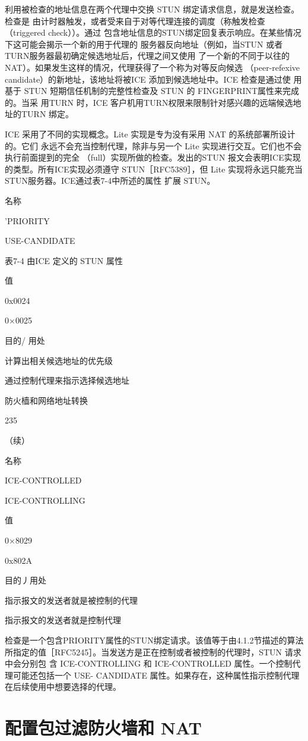 利用被检查的地址信息在两个代理中交换 STUN 绑定请求信息，就是发送检查。检查是
由计时器触发，或者受来自于对等代理连接的调度（称触发检查（triggered check））。通过
包含地址信息的STUN绑定回复表示响应。在某些情况下这可能会揭示一个新的用于代理的
服务器反向地址（例如，当STUN 或者 TURN服务器最初确定候选地址后，代理之间又使用
了一个新的不同于以往的NAT）。如果发生这样的情况，代理获得了一个称为对等反向候选
（peer-refexive candidate）的新地址，该地址将被ICE 添加到候选地址中。ICE 检查是通过使
用基于 STUN 短期信任机制的完整性检查及 STUN 的 FINGERPRINT属性来完成的。当采
用TURN 时，ICE 客户机用TURN权限来限制针对感兴趣的远端候选地址的TURN 绑定。

ICE 采用了不同的实现概念。Lite 实现是专为没有采用 NAT 的系统部署所设计的。它们
永远不会充当控制代理，除非与另一个 Lite 实现进行交互。它们也不会执行前面提到的完全
（full）实现所做的检查。发出的STUN 报文会表明ICE实现的类型。所有ICE实现必须遵守
STUN［RFC5389］，但 Lite 实现将永远只能充当STUN服务器。ICE通过表7-4中所述的属性
扩展 STUN。

名称

'PRIORITY

USE-CANDIDATE

表7-4 由ICE 定义的 STUN 属性

值

0x0024

0×0025

目的/ 用处

计算出相关候选地址的优先级

通过控制代理来指示选择候选地址

防火樯和网络地址转换

235

（续）

名称

ICE-CONTROLLED

ICE-CONTROLLING

值

0×8029

0x802A

目的丿用处

指示报文的发送者就是被控制的代理

指示报文的发送者就是控制代理

检查是一个包含PRIORITY属性的STUN绑定请求。该值等于由4.1.2节描述的算法
所指定的值［RFC5245］。当发送方是正在控制或者被控制的代理时，STUN 请求中会分别包
含 ICE-CONTROLLING 和 ICE-CONTROLLED 属性。一个控制代理可能还包括一个 USE-
CANDIDATE 属性。如果存在，这种属性指示控制代理在后续使用中想要选择的代理。

\section{配置包过滤防火墙和 NAT}

